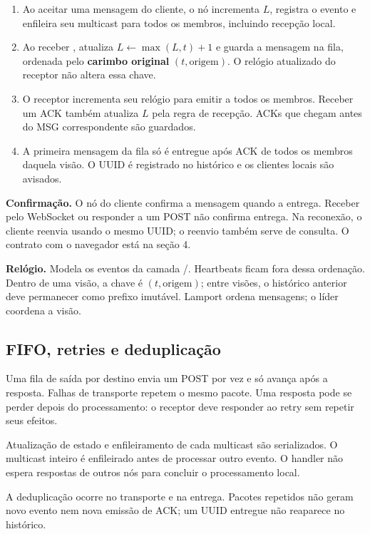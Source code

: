 \documentclass[11pt,a4paper]{article}
\newcommand{\msg}[1]{\texttt{\detokenize{#1}}}
\begin{document}
\begin{enumerate}
\item Ao aceitar uma mensagem do cliente, o nó incrementa $L$, registra o evento
e enfileira seu multicast para todos os membros, incluindo recepção local.
\item Ao receber \msg{MSG}, atualiza $L \leftarrow \max(L,t)+1$ e guarda a
mensagem na fila, ordenada pelo \textbf{carimbo original} $(t,\mathrm{origem})$.
O relógio atualizado do receptor não altera essa chave.
\item O receptor incrementa seu relógio para emitir \msg{ACK} a todos os membros.
Receber um ACK também atualiza $L$ pela regra de recepção.
ACKs que chegam antes do MSG correspondente são guardados.
\item A primeira mensagem da fila só é entregue após ACK de todos os membros
daquela visão. O UUID é registrado no histórico e os clientes locais são avisados.
\end{enumerate}

\textbf{Confirmação.} O nó do cliente confirma a mensagem quando a entrega.
Receber pelo WebSocket ou responder a um POST não confirma entrega.
Na reconexão, o cliente reenvia usando o mesmo UUID; o reenvio também serve
de consulta. O contrato com o navegador está na seção 4.

\textbf{Relógio.} Modela os eventos da camada \msg{MSG}/\msg{ACK}.
Heartbeats ficam fora dessa ordenação. Dentro de uma visão, a chave é
$(t,\mathrm{origem})$; entre visões, o histórico anterior deve permanecer
como prefixo imutável. Lamport ordena mensagens; o líder coordena a visão.

\subsection*{FIFO, retries e deduplicação}
Uma fila de saída por destino envia um POST por vez e só avança após a resposta.
Falhas de transporte repetem o mesmo pacote. Uma resposta pode se perder depois
do processamento: o receptor deve responder ao retry sem repetir seus efeitos.

Atualização de estado e enfileiramento de cada multicast são serializados.
O multicast inteiro é enfileirado antes de processar outro evento.
O handler não espera respostas de outros nós para concluir o processamento local.

A deduplicação ocorre no transporte e na entrega. Pacotes repetidos não geram
novo evento nem nova emissão de ACK; um UUID entregue não reaparece no histórico.
\end{document}
